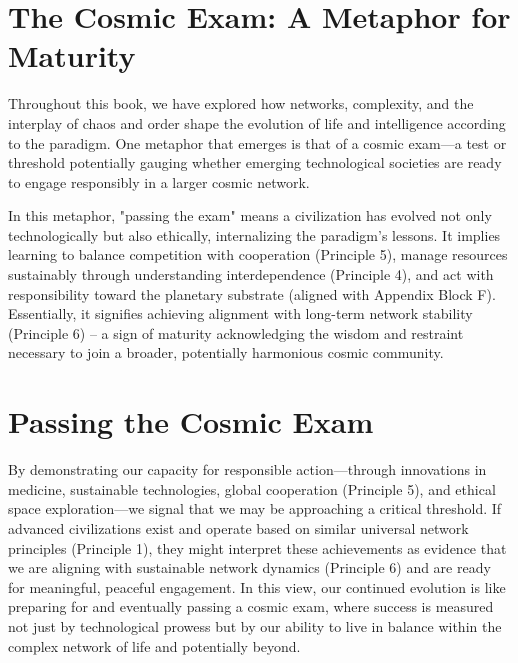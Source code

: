 \documentclass[12pt,openany]{book}
\begin{document}
\section{The Cosmic Exam: A Metaphor for Maturity}
Throughout this book, we have explored how networks, complexity, and the interplay of chaos and order shape the evolution of life and intelligence according to the paradigm. One metaphor that emerges is that of a cosmic exam—a test or threshold potentially gauging whether emerging technological societies are ready to engage responsibly in a larger cosmic network.

In this metaphor, "passing the exam" means a civilization has evolved not only technologically but also ethically, internalizing the paradigm's lessons. It implies learning to balance competition with cooperation (Principle 5), manage resources sustainably through understanding interdependence (Principle 4), and act with responsibility toward the planetary substrate (aligned with Appendix Block F). Essentially, it signifies achieving alignment with long-term network stability (Principle 6) – a sign of maturity acknowledging the wisdom and restraint necessary to join a broader, potentially harmonious cosmic community. %

\section{Passing the Cosmic Exam}
By demonstrating our capacity for responsible action—through innovations in medicine, sustainable technologies, global cooperation (Principle 5), and ethical space exploration—we signal that we may be approaching a critical threshold. If advanced civilizations exist and operate based on similar universal network principles (Principle 1), they might interpret these achievements as evidence that we are aligning with sustainable network dynamics (Principle 6) and are ready for meaningful, peaceful engagement. In this view, our continued evolution is like preparing for and eventually passing a cosmic exam, where success is measured not just by technological prowess but by our ability to live in balance within the complex network of life and potentially beyond. %
\end{document}
